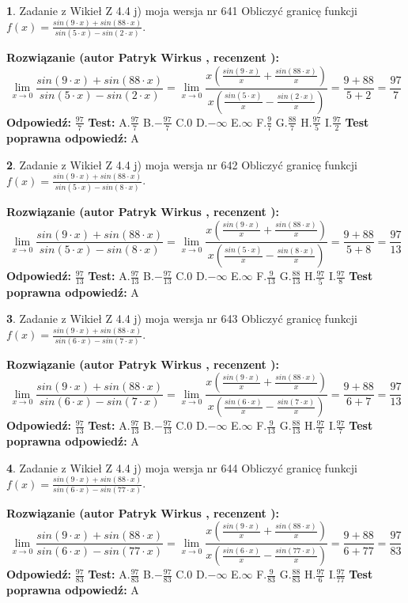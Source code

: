 \documentclass[12pt, a4paper]{article}
\theoremstyle{definition} %
\newtheorem{zad}{}
\newcommand{\zadStart}[1]{\begin{zad}#1\newline}
\newcommand{\zadStop}{\end{zad}}
\newcommand{\rozwStart}[2]{\noindent \textbf{Rozwiązanie (autor #1 , recenzent #2): }\newline}
\newcommand{\rozwStop}{\newline}
\newcommand{\odpStart}{\noindent \textbf{Odpowiedź:}\newline}
\newcommand{\odpStop}{\newline}
\newcommand{\testStart}{\noindent \textbf{Test:}\newline}
\newcommand{\testStop}{\newline}
\newcommand{\kluczStart}{\noindent \textbf{Test poprawna odpowiedź:}\newline}
\newcommand{\kluczStop}{\newline}
\begin{document}
\zadStart{Zadanie z Wikieł Z 4.4 j) moja wersja nr 641}
Obliczyć granicę funkcji $f(x)=\frac{sin(9\cdot x) +sin(88\cdot x)}{sin(5\cdot x) -sin(2\cdot x)}$.
\zadStop
\rozwStart{Patryk Wirkus}{}
$$\lim\limits_{x\to 0}\frac{sin(9\cdot x) +sin(88\cdot x)}{sin(5\cdot x) -sin(2\cdot x)}=\lim\limits_{x\to 0}\frac{x(\frac{sin(9\cdot x)}{x}+\frac{sin(88\cdot x)}{x})}{x(\frac{sin(5\cdot x)}{x}-\frac{sin(2\cdot x)}{x})}=\frac{9+88}{5+2} = \frac{97}{7}$$
\rozwStop
\odpStart
$\frac{97}{7}$
\odpStop
\testStart
A.$\frac{97}{7}$
B.$-\frac{97}{7}$
C.$0$
D.$-\infty$
E.$\infty$
F.$\frac{9}{7}$
G.$\frac{88}{7}$
H.$\frac{97}{5}$
I.$\frac{97}{2}$
\testStop
\kluczStart
A
\kluczStop



\zadStart{Zadanie z Wikieł Z 4.4 j) moja wersja nr 642}
Obliczyć granicę funkcji $f(x)=\frac{sin(9\cdot x) +sin(88\cdot x)}{sin(5\cdot x) -sin(8\cdot x)}$.
\zadStop
\rozwStart{Patryk Wirkus}{}
$$\lim\limits_{x\to 0}\frac{sin(9\cdot x) +sin(88\cdot x)}{sin(5\cdot x) -sin(8\cdot x)}=\lim\limits_{x\to 0}\frac{x(\frac{sin(9\cdot x)}{x}+\frac{sin(88\cdot x)}{x})}{x(\frac{sin(5\cdot x)}{x}-\frac{sin(8\cdot x)}{x})}=\frac{9+88}{5+8} = \frac{97}{13}$$
\rozwStop
\odpStart
$\frac{97}{13}$
\odpStop
\testStart
A.$\frac{97}{13}$
B.$-\frac{97}{13}$
C.$0$
D.$-\infty$
E.$\infty$
F.$\frac{9}{13}$
G.$\frac{88}{13}$
H.$\frac{97}{5}$
I.$\frac{97}{8}$
\testStop
\kluczStart
A
\kluczStop



\zadStart{Zadanie z Wikieł Z 4.4 j) moja wersja nr 643}
Obliczyć granicę funkcji $f(x)=\frac{sin(9\cdot x) +sin(88\cdot x)}{sin(6\cdot x) -sin(7\cdot x)}$.
\zadStop
\rozwStart{Patryk Wirkus}{}
$$\lim\limits_{x\to 0}\frac{sin(9\cdot x) +sin(88\cdot x)}{sin(6\cdot x) -sin(7\cdot x)}=\lim\limits_{x\to 0}\frac{x(\frac{sin(9\cdot x)}{x}+\frac{sin(88\cdot x)}{x})}{x(\frac{sin(6\cdot x)}{x}-\frac{sin(7\cdot x)}{x})}=\frac{9+88}{6+7} = \frac{97}{13}$$
\rozwStop
\odpStart
$\frac{97}{13}$
\odpStop
\testStart
A.$\frac{97}{13}$
B.$-\frac{97}{13}$
C.$0$
D.$-\infty$
E.$\infty$
F.$\frac{9}{13}$
G.$\frac{88}{13}$
H.$\frac{97}{6}$
I.$\frac{97}{7}$
\testStop
\kluczStart
A
\kluczStop



\zadStart{Zadanie z Wikieł Z 4.4 j) moja wersja nr 644}
Obliczyć granicę funkcji $f(x)=\frac{sin(9\cdot x) +sin(88\cdot x)}{sin(6\cdot x) -sin(77\cdot x)}$.
\zadStop
\rozwStart{Patryk Wirkus}{}
$$\lim\limits_{x\to 0}\frac{sin(9\cdot x) +sin(88\cdot x)}{sin(6\cdot x) -sin(77\cdot x)}=\lim\limits_{x\to 0}\frac{x(\frac{sin(9\cdot x)}{x}+\frac{sin(88\cdot x)}{x})}{x(\frac{sin(6\cdot x)}{x}-\frac{sin(77\cdot x)}{x})}=\frac{9+88}{6+77} = \frac{97}{83}$$
\rozwStop
\odpStart
$\frac{97}{83}$
\odpStop
\testStart
A.$\frac{97}{83}$
B.$-\frac{97}{83}$
C.$0$
D.$-\infty$
E.$\infty$
F.$\frac{9}{83}$
G.$\frac{88}{83}$
H.$\frac{97}{6}$
I.$\frac{97}{77}$
\testStop
\kluczStart
A
\kluczStop
\end{document}

